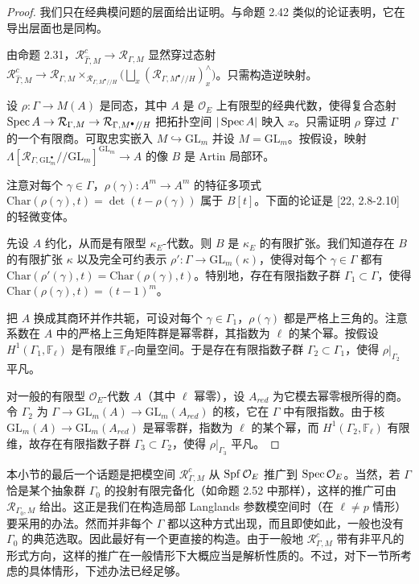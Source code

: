 \begin{proof}
我们只在经典模问题的层面给出证明。与命题 2.42 类似的论证表明，它在导出层面也是同构。

由命题 2.31，$\mathcal R^c_{\widehat\Gamma,M}\to\mathcal R_{\Gamma,M}$ 显然穿过态射
$\mathcal R^c_{\widehat\Gamma,M}\to \mathcal R_{\Gamma,M}\times_{\mathcal R_{\Gamma,M^{\bullet}/\!/H}}\big(\bigsqcup_x(\mathcal R_{\Gamma,M^{\bullet}/\!/H})^{\wedge}_x\big)$。只需构造逆映射。

设 $\rho:\Gamma\to M(A)$ 是同态，其中 $A$ 是 $\mathcal O_E$ 上有限型的经典代数，使得复合态射
$\operatorname{Spec} A\to\mathcal R_{\Gamma,M}\to\mathcal R_{\Gamma,M^{\bullet}/\!/H}$ 把拓扑空间 $|\operatorname{Spec} A|$ 映入 $x$。只需证明 $\rho$ 穿过 $\Gamma$ 的一个有限商。可取忠实嵌入 $M\hookrightarrow \mathrm{GL}_m$ 并设 $M=\mathrm{GL}_m$。按假设，映射 $\Lambda[\mathcal R_{\Gamma,\mathrm{GL}_m^{\bullet}}/\!/\mathrm{GL}_m]^{\mathrm{GL}_m}\to A$ 的像 $B$ 是 Artin 局部环。

注意对每个 $\gamma\in\Gamma$，$\rho(\gamma):A^m\to A^m$ 的特征多项式 $\mathrm{Char}(\rho(\gamma),t)=\det(t-\rho(\gamma))$ 属于 $B[t]$。下面的论证是 [22, 2.8-2.10] 的轻微变体。

先设 $A$ 约化，从而是有限型 $\kappa_E$-代数。则 $B$ 是 $\kappa_E$ 的有限扩张。我们知道存在 $B$ 的有限扩张 $\kappa$ 以及完全可约表示 $\rho':\Gamma\to\mathrm{GL}_m(\kappa)$，使得对每个 $\gamma\in\Gamma$ 都有 $\mathrm{Char}(\rho'(\gamma),t)=\mathrm{Char}(\rho(\gamma),t)$。特别地，存在有限指数子群 $\Gamma_1\subset\Gamma$，使得 $\mathrm{Char}(\rho(\gamma),t)=(t-1)^m$。

把 $A$ 换成其商环并作共轭，可设对每个 $\gamma\in\Gamma_1$，$\rho(\gamma)$ 都是严格上三角的。注意系数在 $A$ 中的严格上三角矩阵群是幂零群，其指数为 $\ell$ 的某个幂。按假设 $H^1(\Gamma_1,\mathbb F_\ell)$ 是有限维 $\mathbb F_\ell$-向量空间。于是存在有限指数子群 $\Gamma_2\subset\Gamma_1$，使得 $\rho|_{\Gamma_2}$ 平凡。

对一般的有限型 $\mathcal O_E$-代数 $A$（其中 $\ell$ 幂零），设 $A_{red}$ 为它模去幂零根所得的商。令 $\Gamma_2$ 为 $\Gamma\to\mathrm{GL}_m(A)\to\mathrm{GL}_m(A_{red})$ 的核，它在 $\Gamma$ 中有限指数。由于核 $\mathrm{GL}_m(A)\to\mathrm{GL}_m(A_{red})$ 是幂零群，指数为 $\ell$ 的某个幂，而 $H^1(\Gamma_2,\mathbb F_\ell)$ 有限维，故存在有限指数子群 $\Gamma_3\subset\Gamma_2$，使得 $\rho|_{\Gamma_3}$ 平凡。
\end{proof}

本小节的最后一个话题是把模空间 $\mathcal R^c_{\Gamma,M}$ 从 $\operatorname{Spf}\mathcal O_E$ 推广到 $\operatorname{Spec}\mathcal O_E$。当然，若 $\Gamma$ 恰是某个抽象群 $\Gamma_0$ 的投射有限完备化（如命题 2.52 中那样），这样的推广可由 $\mathcal R_{\Gamma_0,M}$ 给出。这正是我们在构造局部 Langlands 参数模空间时（在 $\ell\neq p$ 情形）要采用的办法。然而并非每个 $\Gamma$ 都以这种方式出现，而且即使如此，一般也没有 $\Gamma_0$ 的典范选取。因此最好有一个更直接的构造。由于一般地 $\mathcal R^c_{\Gamma,M}$ 带有非平凡的形式方向，这样的推广在一般情形下大概应当是解析性质的。不过，对下一节所考虑的具体情形，下述办法已经足够。

